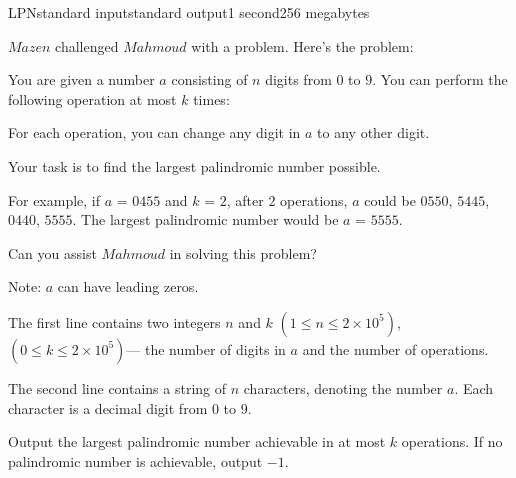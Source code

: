 \begin{problem}{LPN}{standard input}{standard output}{1 second}{256 megabytes}

$Mazen$ challenged $Mahmoud$ with a problem. Here's the problem:

You are given a number $a$ consisting of $n$ digits from $0$ to $9$. You can perform the following operation at most $k$ times:

For each operation, you can change any digit in $a$ to any other digit.

Your task is to find the largest palindromic number possible.

For example, if $a$ = $0455$ and $k$ = $2$, after $2$ operations, $a$ could be {$0550$, $5445$, $0440$, $5555$}. The largest palindromic number would be $a$ = $5555$.

Can you assist $Mahmoud$ in solving this problem?

Note: $a$ can have leading zeros.

\InputFile
The first line contains two integers $n$ and $k$ $(1\le n\le2\times10^5)$,$(0 \le k \le 2\times10^5)$--- the number of digits in $a$ and the number of operations.

The second line contains a string of $n$ characters, denoting the number $a$. Each character is a decimal digit from $0$ to $9$.

\OutputFile
Output the largest palindromic number achievable in at most $k$ operations. If no palindromic number is achievable, output $-1$.

\Examples

\begin{example}
%
%
%
\end{example}

\end{problem}

